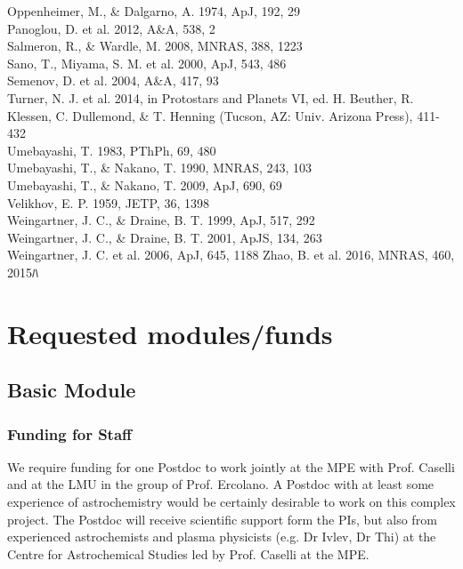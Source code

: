 \documentclass[10pt,fleqn,twoside]{article}
\newcommand{\Tcol}{\color{blue}}
\begin{document}
Oppenheimer, M., \& Dalgarno, A. 1974, ApJ, 192, 29 \\
Panoglou, D. et al. 2012, A\&A, 538, 2 \\
Salmeron, R., \& Wardle, M. 2008, MNRAS, 388, 1223 \\
Sano, T., Miyama, S. M. et al. 2000, ApJ, 543, 486 \\
Semenov, D. et al. 2004, A\&A, 417, 93 \\
Turner, N. J. et al. 2014, in Protostars and Planets VI, ed. H. Beuther, R. Klessen, C. Dullemond, \& T. Henning (Tucson, AZ: Univ. Arizona Press), 411-432 \\
Umebayashi, T. 1983, PThPh, 69, 480 \\
Umebayashi, T., \& Nakano, T. 1990, MNRAS, 243, 103 \\
Umebayashi, T., \& Nakano, T. 2009, ApJ, 690, 69 \\
Velikhov, E. P. 1959, JETP, 36, 1398 \\
Weingartner, J. C., \& Draine, B. T. 1999, ApJ, 517, 292 \\
Weingartner, J. C., \& Draine, B. T. 2001, ApJS, 134, 263 \\
Weingartner, J. C. et al. 2006, ApJ, 645, 1188
Zhao, B. et al. 2016, MNRAS, 460, 2015ﾊ\\

\section{\Tcol Requested modules/funds}
\renewcommand{\leftmark}{\sc  Requested modules/funds}

\subsection{\Tcol Basic Module}

\subsubsection{\Tcol Funding for Staff}
We require funding for one Postdoc to work jointly at the MPE with Prof. Caselli and at the LMU in the group of
Prof. Ercolano.
A Postdoc with at least some experience of astrochemistry would be certainly desirable  to work on this complex  project. The Postdoc will receive scientific support form the PIs, but also from experienced astrochemists and plasma physicists (e.g. Dr Ivlev, Dr Thi) at the Centre for Astrochemical Studies led by Prof. Caselli at the MPE. 
\end{document}
